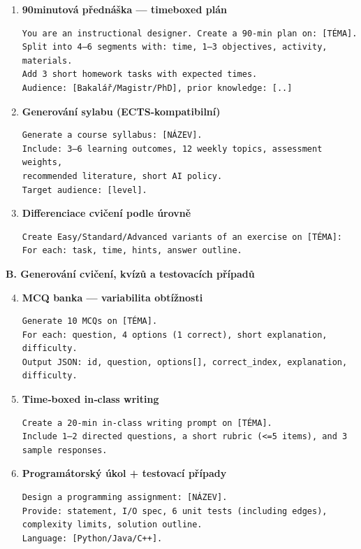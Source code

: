 \documentclass{report}%
\begin{document}
\begin{enumerate}
  \item \textbf{90minutová přednáška — timeboxed plán}
  \begin{verbatim}
You are an instructional designer. Create a 90-min plan on: [TÉMA].
Split into 4–6 segments with: time, 1–3 objectives, activity, materials.
Add 3 short homework tasks with expected times.
Audience: [Bakalář/Magistr/PhD], prior knowledge: [..]
  \end{verbatim}
  \item \textbf{Generování sylabu (ECTS‑kompatibilní)}
  \begin{verbatim}
Generate a course syllabus: [NÁZEV].
Include: 3–6 learning outcomes, 12 weekly topics, assessment weights,
recommended literature, short AI policy.
Target audience: [level].
  \end{verbatim}
  \item \textbf{Differenciace cvičení podle úrovně}
  \begin{verbatim}
Create Easy/Standard/Advanced variants of an exercise on [TÉMA]:
For each: task, time, hints, answer outline.
  \end{verbatim}
\end{enumerate}

\medskip

\textbf{B. Generování cvičení, kvízů a testovacích případů}

\begin{enumerate}
  \setcounter{enumi}{3}
  \item \textbf{MCQ banka — variabilita obtížnosti}
  \begin{verbatim}
Generate 10 MCQs on [TÉMA].
For each: question, 4 options (1 correct), short explanation, difficulty.
Output JSON: id, question, options[], correct_index, explanation, difficulty.
  \end{verbatim}
  \item \textbf{Time‑boxed in‑class writing}
  \begin{verbatim}
Create a 20-min in-class writing prompt on [TÉMA].
Include 1–2 directed questions, a short rubric (<=5 items), and 3 sample responses.
  \end{verbatim}
  \item \textbf{Programátorský úkol + testovací případy}
  \begin{verbatim}
Design a programming assignment: [NÁZEV].
Provide: statement, I/O spec, 6 unit tests (including edges), complexity limits, solution outline.
Language: [Python/Java/C++].
  \end{verbatim}
\end{enumerate}
\end{document}
